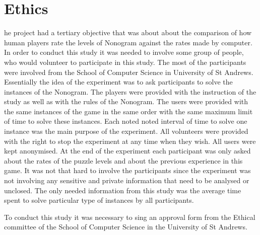 \let\textcircled=\pgftextcircled
\chapter{Ethics}
\label{chap:5}
he project had a tertiary objective that was about about the comparison of how human players rate the levels of Nonogram against the rates made by computer. In order to conduct this study it was needed to involve some group of people, who would volunteer to participate in this study. The most of the participants were involved from the School of Computer Science in University of St Andrews. Essentially the idea of the experiment was to ask participants to solve the instances of the Nonogram. The players were provided with the instruction of the study as well as with the rules of the Nonogram. The users were provided with the same instances of the game in the same order with the same maximum limit of time to solve these instances. Each noted noted interval of time to solve one instance was the main purpose of the experiment. All volunteers were provided with the right to stop the experiment at any time when they wish. All users were kept anonymised. At the end of the experiment each participant was only asked about the rates of the puzzle levels and about the previous experience in this game. It was not that hard to involve the participants since the experiment was not involving any sensitive and private information that need to be analysed or unclosed. The only needed information from this study was the average time spent to solve particular type of instances by all participants. 

To conduct this study it was necessary to sing an approval form from the Ethical committee of the School of Computer Science in the University of St Andrews. 
